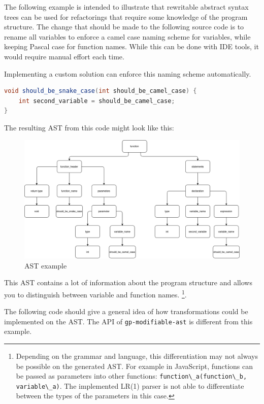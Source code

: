 The following example is intended to illustrate that rewritable abstract syntax trees can be used for refactorings that require some knowledge of the program structure.
The change that should be made to the following source code is to rename all variables to enforce a camel case naming scheme for variables, while keeping
Pascal case for function names. While this can be done with IDE tools, it would require manual effort each time.

Implementing a custom solution can enforce this naming scheme automatically.

\begin{lstlisting}[language=Java, caption=Example of untransformed code]
void should_be_snake_case(int should_be_camel_case) {
    int second_variable = should_be_camel_case;
}
\end{lstlisting}

The resulting AST from this code might look like this:
\begin{figure}[H]
    \centering
    \includegraphics[scale=0.40]{fig/ast_example.png}
    \caption{AST example}
\end{figure}

This AST contains a lot of information about the program structure and allows you to distinguish between variable and function names.
\footnote{
    Depending on the grammar and language, this differentiation may not always be possible on the generated AST. 
    For example in JavaScript, functions can be passed as parameters into other functions: 
    \lstinline{function\_a(function\_b, variable\_a)}.
    The implemented LR(1) parser is not able to differentiate between the types of the parameters in this case.}. 

The following code should give a general idea of how transformations could be implemented on the AST. 
The API of \verb|gp-modifiable-ast| is different from this example.

